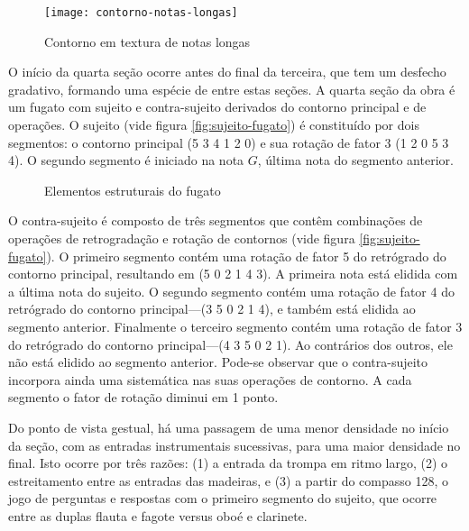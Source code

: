 \begin{figure}
  \centering
  \texttt{[image: contorno-notas-longas]}
  \caption{Contorno em textura de notas longas}
  \label{fig:contorno-notas-longas}
\end{figure}

O início da quarta seção ocorre antes do final da terceira, que tem um
desfecho gradativo, formando uma espécie de  entre estas
seções. A quarta seção da obra é um fugato com sujeito e
contra-sujeito derivados do contorno principal e de operações. O
sujeito (vide figura \ref{fig:sujeito-fugato}) é constituído por dois
segmentos: o contorno principal (5 3 4 1 2 0) e sua rotação de fator 3
(1 2 0 5 3 4). O segundo segmento é iniciado na nota $G$, última nota
do segmento anterior.

\begin{figure}
  \centering

  \caption{Elementos estruturais do fugato}
  \label{fig:elementos-fugato}
\end{figure}

O contra-sujeito é composto de três segmentos que contêm combinações
de operações de retrogradação e rotação de contornos (vide figura
\ref{fig:sujeito-fugato}). O primeiro segmento contém uma rotação de
fator 5 do retrógrado do contorno principal, resultando em (5 0 2 1 4
3). A primeira nota está elidida com a última nota do sujeito. O
segundo segmento contém uma rotação de fator 4 do retrógrado do
contorno principal---(3 5 0 2 1 4), e também está elidida ao segmento
anterior. Finalmente o terceiro segmento contém uma rotação de fator 3
do retrógrado do contorno principal---(4 3 5 0 2 1). Ao contrários dos
outros, ele não está elidido ao segmento anterior. Pode-se observar
que o contra-sujeito incorpora ainda uma sistemática nas suas
operações de contorno. A cada segmento o fator de rotação diminui em 1
ponto.

Do ponto de vista gestual, há uma passagem de uma menor densidade no
início da seção, com as entradas instrumentais sucessivas, para uma
maior densidade no final. Isto ocorre por três razões: (1) a entrada
da trompa em ritmo largo, (2) o estreitamento entre as entradas das
madeiras, e (3) a partir do compasso 128, o jogo de perguntas e
respostas com o primeiro segmento do sujeito, que ocorre entre as
duplas flauta e fagote versus oboé e clarinete.


